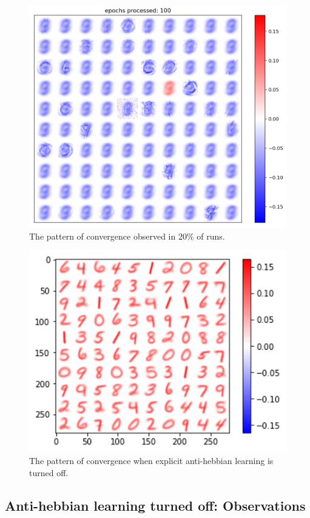 \documentclass[a4paper]{report}
\begin{document}
\begin{figure} [H]
    \centering
    \includegraphics [width=12cm ] {h/nove.png}
    \caption{The pattern of convergence observed in 20\% of runs.}
    \label{nove}
\end{figure}

\begin{figure} [H]
    \centering
    \includegraphics [width=12cm ] {h/nodelta.png}
    \caption{The pattern of convergence when explicit anti-hebbian learning is turned off.}
    \label{nodelta}
\end{figure}

\subsection{Anti-hebbian learning turned off: Observations}
\end{document}
